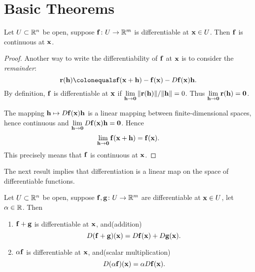 \section{Basic Theorems}
\begin{lemma}
Let $U\subset\mathbb R^n$ be open, suppose $\vb{f}\colon U\to\mathbb R^m$ is differentiable at $\vb{x}\in U$. Then $\vb{f}$ is continuous at $\vb{x}$.
\end{lemma}

\begin{proof}
Another way to write the differentiability of $\vb{f}$ at $\vb{x}$ is to consider the \emph{remainder}:
\[\vb{r}(\vb{h})\colonequals\vb{f}(\vb{x}+\vb{h})-\vb{f}(\vb{x})-D\vb{f}(\vb{x})\vb{h}.\]
By definition, $\vb{f}$ is differentiable at $\vb{x}$ if $\displaystyle\lim_{\vb{h}\to\vb{0}}\norm{\vb{r}(\vb{h})}/\norm{\vb{h}}=0$. Thus $\displaystyle\lim_{\vb{h}\to\vb{0}}\vb{r}(\vb{h})=\vb{0}$.

The mapping $\vb{h}\mapsto D\vb{f}(\vb{x})\vb{h}$ is a linear mapping between finite-dimensional spaces, hence continuous and $\displaystyle\lim_{\vb{h}\to\vb{0}}D\vb{f}(\vb{x})\vb{h}=\vb{0}$. Hence
\[\lim_{\vb{h}\to\vb{0}}\vb{f}(\vb{x}+\vb{h})=\vb{f}(\vb{x}).\]
This precisely means that $\vb{f}$ is continuous at $\vb{x}$.
\end{proof}

The next result implies that differentiation is a linear map on the space of differentiable functions.

\begin{lemma}
Let $U\subset\mathbb R^n$ be open, suppose $\vb{f},\vb{g}\colon U\to\mathbb R^m$ are differentiable at $\vb{x}\in U$, let $\alpha\in\mathbb R$. Then
\begin{enumerate}[label=(\roman*)]
\item $\vb{f}+\vb{g}$ is differentiable at $\vb{x}$, and\hfill(addition)
\[D(\vb{f}+\vb{g})(\vb{x})=D\vb{f}(\vb{x})+D\vb{g}(\vb{x}).\]
\item $\alpha\vb{f}$ is differentiable at $\vb{x}$, and\hfill(scalar multiplication)
\[D(\alpha\vb{f})(\vb{x})=\alpha D\vb{f}(\vb{x}).\]
\end{enumerate}
\end{lemma}

